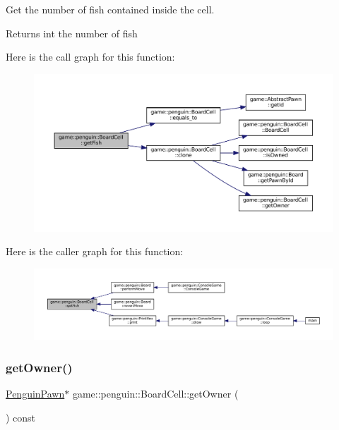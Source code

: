 Get the number of fish contained inside the cell. 

\begin{DoxyReturn}{Returns}
int the number of fish 
\end{DoxyReturn}
Here is the call graph for this function\+:
\nopagebreak
\begin{figure}[H]
\begin{center}
\leavevmode
\includegraphics[width=350pt]{classgame_1_1penguin_1_1_board_cell_abe8f2dc0eef3aed1e8701dc0b021c5a6_cgraph}
\end{center}
\end{figure}
Here is the caller graph for this function\+:
\nopagebreak
\begin{figure}[H]
\begin{center}
\leavevmode
\includegraphics[width=350pt]{classgame_1_1penguin_1_1_board_cell_abe8f2dc0eef3aed1e8701dc0b021c5a6_icgraph}
\end{center}
\end{figure}
\mbox{\label{classgame_1_1penguin_1_1_board_cell_a011487b961b356a891144edcccc1473f}} 
\subsubsection{\texorpdfstring{get\+Owner()}{getOwner()}}
{\footnotesize\ttfamily \hyperlink{classgame_1_1penguin_1_1_penguin_pawn}{Penguin\+Pawn}$\ast$ game\+::penguin\+::\+Board\+Cell\+::get\+Owner (\begin{DoxyParamCaption}{ }\end{DoxyParamCaption}) const\hspace{0.3cm}{\ttfamily [inline]}}



